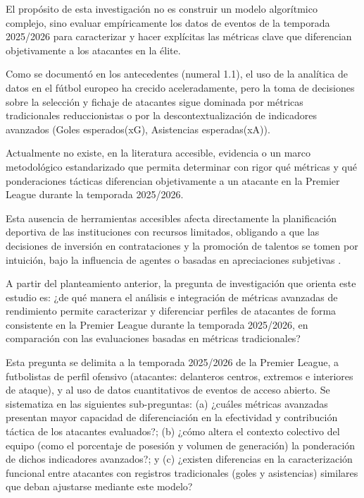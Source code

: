 El propósito de esta investigación no es construir un modelo algorítmico complejo, sino evaluar empíricamente los datos de eventos de la temporada 2025/2026 para caracterizar y hacer explícitas las métricas clave que diferencian objetivamente a los atacantes en la élite.

\vspace{1em}

\hypertarget{sec:descripcion}{}%
\par
Como se documentó en los antecedentes (numeral 1.1), el uso de la analítica de datos en el fútbol europeo ha crecido aceleradamente, pero la toma de decisiones sobre la selección y fichaje de atacantes sigue dominada por métricas tradicionales reduccionistas o por la descontextualización de indicadores avanzados (Goles esperados(xG), Asistencias esperadas(xA)). 

Actualmente no existe, en la literatura accesible, evidencia o un marco metodológico estandarizado que permita determinar con rigor qué métricas y qué ponderaciones tácticas diferencian objetivamente a un atacante en la Premier League durante la temporada 2025/2026. 

Esta ausencia de herramientas accesibles afecta directamente la planificación deportiva de las instituciones con recursos limitados, obligando a que las decisiones de inversión en contrataciones y la promoción de talentos se tomen por intuición, bajo la influencia de agentes o basadas en apreciaciones subjetivas \cite{lolli2024data}.

\vspace{1em}

\hypertarget{sec:formulacion}{}%
\par
A partir del planteamiento anterior, la pregunta de investigación que orienta este estudio es: ¿de qué manera el análisis e integración de métricas avanzadas de rendimiento permite caracterizar y diferenciar perfiles de atacantes de forma consistente en la Premier League durante la temporada 2025/2026, en comparación con las evaluaciones basadas en métricas tradicionales?

Esta pregunta se delimita a la temporada 2025/2026 de la Premier League, a futbolistas de perfil ofensivo (atacantes: delanteros centros, extremos e interiores de ataque), y al uso de datos cuantitativos de eventos de acceso abierto. Se sistematiza en las siguientes sub-preguntas: (a) ¿cuáles métricas avanzadas presentan mayor capacidad de diferenciación en la efectividad y contribución táctica de los atacantes evaluados?; (b) ¿cómo altera el contexto colectivo del equipo (como el porcentaje de posesión y volumen de generación) la ponderación de dichos indicadores avanzados?; y (c) ¿existen diferencias en la caracterización funcional entre atacantes con registros tradicionales (goles y asistencias) similares que deban ajustarse mediante este modelo?

